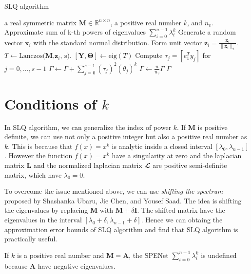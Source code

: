 \documentclass[senior,final,11pt]{iscs-thesis}
\begin{document}
\begin{algorithm}
    \caption{SLQ algorithm}
    \begin{algorithmic}[1]
    \renewcommand{\algorithmicrequire}{\textbf{Input:}}
    \renewcommand{\algorithmicensure}{\textbf{Output:}}
    \REQUIRE a real symmetric matrix ${\mathbf M} \in {\mathbb R}^{n\times n}$, a positive real number $k$, and $n_v$.
    \ENSURE  Approximate sum of k-th powers of eigenvalues $\sum_{i=0}^{n-1} \lambda_i^k$
     \STATE Generate a random vector $\mathbf{x}_i$ with the standard normal distribution.
     \STATE Form unit vector $\mathbf{z}_i = \frac{\mathbf{x}_i}{\|\mathbf{x}_i\|_2}$.
     \STATE $T \leftarrow \text{Lanczos($\mathbf{M}$,$\mathbf{z}_i$, s)}$.
     \STATE $[\mathbf{Y}, \mathbf{\Theta}] \leftarrow \text{eig}(T)$
     \STATE Compute $\tau_j = [e_1^T y_j]$ for $j=0, ..., s-1$
     \STATE $\Gamma \leftarrow \Gamma + \sum_{j=0}^{s-1} (\tau_j)^2 (\theta_j)^k$
     \ENDFOR
    \STATE $\Gamma \leftarrow \frac{n}{n_v}\Gamma$
    \RETURN $\Gamma$
    \end{algorithmic}
\end{algorithm}


\section{Conditions of $k$}
In SLQ algorithm, we can generalize the index of power $k$. If ${\mathbf M}$ is positive definite, we can use not only a positive integer but also a positive real number as $k$. This is because that $f(x)=x^k$ is analytic inside a closed interval $[\lambda_0, \lambda_{n-1}]$. However the function $f(x)=x^k$ have a singularity at zero and the laplacian matrix ${\mathbf L}$ and the normalized laplacian matrix ${\mathbfcal L}$ are positive semi-definite matrix, which have $\lambda_0 = 0$.

To overcome the issue mentioned above, we can use {\it shifting the spectrum} proposed by Shashanka Ubaru, Jie Chen, and Yousef Saad\cite{ubaru2017fast}. The idea is shifting the eigenvalues by replacing ${\mathbf M}$ with ${\mathbf M}+\delta{\mathbf I}$. The shifted matrix have the eigenvalues in the interval $[\lambda_0 + \delta, \lambda_{n-1}+ \delta]$. Hence we can obtaing the approximation error bounds of SLQ algorithm and find that SLQ algorithm is practically useful.

If $k$ is a positive real number and ${\mathbf M}={\mathbf A}$, the SPENet $\sum_{i=0}^{n-1} \lambda_i^k$ is undefined because ${\mathbf A}$ have negative eigenvalues.
\end{document}
